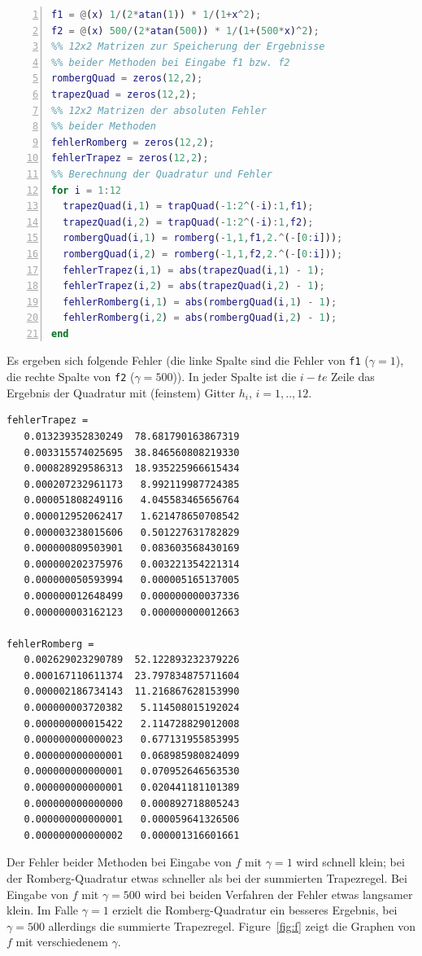 \documentclass[11pt,a4paper,ngerman]{article}
\begin{document}
\begin{lstlisting}[language=matlab,numbers=left]
%% f1 und f2 sind die beiden zu integrierenden Funktionen
f1 = @(x) 1/(2*atan(1)) * 1/(1+x^2);
f2 = @(x) 500/(2*atan(500)) * 1/(1+(500*x)^2);
%% 12x2 Matrizen zur Speicherung der Ergebnisse
%% beider Methoden bei Eingabe f1 bzw. f2
rombergQuad = zeros(12,2);
trapezQuad = zeros(12,2);
%% 12x2 Matrizen der absoluten Fehler
%% beider Methoden
fehlerRomberg = zeros(12,2);
fehlerTrapez = zeros(12,2);
%% Berechnung der Quadratur und Fehler
for i = 1:12
  trapezQuad(i,1) = trapQuad(-1:2^(-i):1,f1);
  trapezQuad(i,2) = trapQuad(-1:2^(-i):1,f2);
  rombergQuad(i,1) = romberg(-1,1,f1,2.^(-[0:i]));
  rombergQuad(i,2) = romberg(-1,1,f2,2.^(-[0:i]));
  fehlerTrapez(i,1) = abs(trapezQuad(i,1) - 1);
  fehlerTrapez(i,2) = abs(trapezQuad(i,2) - 1);
  fehlerRomberg(i,1) = abs(rombergQuad(i,1) - 1);
  fehlerRomberg(i,2) = abs(rombergQuad(i,2) - 1);
end
\end{lstlisting}

Es ergeben sich folgende Fehler (die linke Spalte sind die Fehler von \texttt{f1} ($\gamma = 1$), die rechte Spalte von \texttt{f2} ($\gamma = 500$)). In jeder Spalte ist die $i-te$ Zeile das Ergebnis der Quadratur mit
(feinstem) Gitter $h_i$, $i = 1,.., 12$.
\begin{lstlisting}[basicstyle=\ttfamily\scriptsize\selectfont\upshape]
fehlerTrapez =
   0.013239352830249  78.681790163867319
   0.003315574025695  38.846560808219330
   0.000828929586313  18.935225966615434
   0.000207232961173   8.992119987724385
   0.000051808249116   4.045583465656764
   0.000012952062417   1.621478650708542
   0.000003238015606   0.501227631782829
   0.000000809503901   0.083603568430169
   0.000000202375976   0.003221354221314
   0.000000050593994   0.000005165137005
   0.000000012648499   0.000000000037336
   0.000000003162123   0.000000000012663

fehlerRomberg =
   0.002629023290789  52.122893232379226
   0.000167110611374  23.797834875711604
   0.000002186734143  11.216867628153990
   0.000000003720382   5.114508015192024
   0.000000000015422   2.114728829012008
   0.000000000000023   0.677131955853995
   0.000000000000001   0.068985980824099
   0.000000000000001   0.070952646563530
   0.000000000000001   0.020441181101389
   0.000000000000000   0.000892718805243
   0.000000000000001   0.000059641326506
   0.000000000000002   0.000001316601661
\end{lstlisting}

Der Fehler beider Methoden bei Eingabe von $f$ mit $\gamma = 1$ wird schnell klein; bei der Romberg-Quadratur etwas schneller als bei der summierten Trapezregel. Bei Eingabe von $f$ mit $\gamma = 500$ wird bei beiden Verfahren der Fehler etwas langsamer klein. Im Falle $\gamma = 1$ erzielt die Romberg-Quadratur ein besseres Ergebnis, bei $\gamma = 500$ allerdings die summierte Trapezregel. Figure~\ref{fig:f} zeigt die Graphen von $f$ mit verschiedenem $\gamma$.
\end{document}
